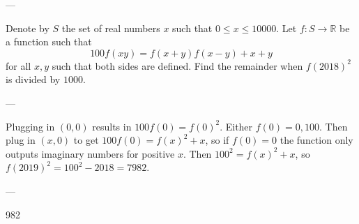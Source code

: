 
---

Denote by $S$ the set of real numbers $x$ such that $0\le x\le 10000$. Let $f:S\to\mathbb{R}$ be a function such that $$100f(xy) = f(x+y)f(x-y)+x+y$$ for all $x,y$ such that both sides are defined. Find the remainder when $f(2018)^2$ is divided by $1000$.

---

Plugging in $(0,0)$ results in $100f(0) = f(0)^2$. Either $f(0) = 0,100$. Then plug in $(x,0)$ to get $100f(0) = f(x)^2+x$, so if $f(0) = 0$ the function only outputs imaginary numbers for positive $x$. Then $100^2 = f(x)^2+x$, so $f(2019)^2 = 100^2-2018 = 7982$.

---

982

